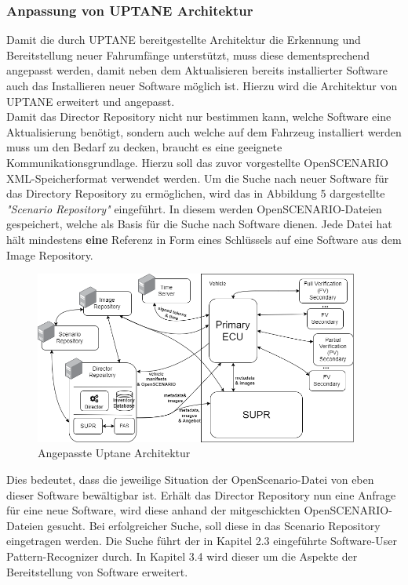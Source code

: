 \subsubsection{Anpassung von UPTANE Architektur}
Damit die durch UPTANE bereitgestellte Architektur die Erkennung und Bereitstellung neuer Fahrumfänge unterstützt, muss diese dementsprechend angepasst werden, damit neben dem Aktualisieren bereits installierter Software auch das Installieren neuer Software möglich ist. Hierzu wird die Architektur von UPTANE erweitert und angepasst.\\

Damit das Director Repository nicht nur bestimmen kann, welche Software eine Aktualisierung benötigt, sondern auch welche auf dem Fahrzeug installiert werden muss um den Bedarf zu decken, braucht es eine geeignete Kommunikationsgrundlage. Hierzu soll das zuvor vorgestellte OpenSCENARIO XML-Speicherformat verwendet werden. Um die Suche nach neuer Software für das Directory Repository zu ermöglichen, wird das in Abbildung 5 dargestellte \textit{"Scenario Repository"} eingeführt. In diesem werden OpenSCENARIO-Dateien gespeichert, welche als Basis für die Suche nach Software dienen. Jede Datei hat hält mindestens \textbf{eine} Referenz in Form eines Schlüssels auf eine Software aus dem Image Repository.
\begin{figure}[H]
	\includegraphics[width=0.95\textwidth]{../pictures/meta_model_fs-uptane-adjusted.png}
	\caption{Angepasste Uptane Architektur}
\end{figure}
Dies bedeutet, dass die jeweilige Situation der OpenScenario-Datei von eben dieser Software bewältigbar ist.  Erhält das Director Repository nun eine Anfrage für eine neue Software, wird diese anhand der mitgeschickten OpenSCENARIO-Dateien gesucht. Bei erfolgreicher Suche, soll diese in das Scenario Repository eingetragen werden. Die Suche führt der in Kapitel 2.3 eingeführte Software-User Pattern-Recognizer durch. In Kapitel 3.4 wird dieser um die Aspekte der Bereitstellung von Software erweitert.\\
